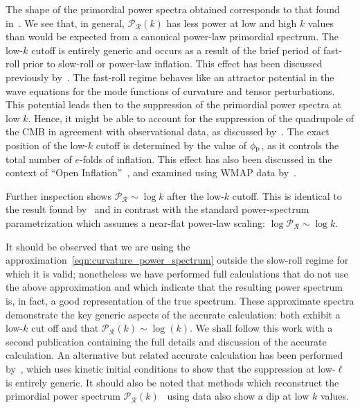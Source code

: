 The shape of the primordial power spectra obtained corresponds to that found in~\cite{lasenby_closed_2003}. We see that, in general, \(\mathcal{P}_\mathcal{R}(k)\) has less power at low and high \(k\) values than would be expected from a canonical power-law primordial spectrum.  The low-\(k\) cutoff is entirely generic and occurs as a result of the brief period of fast-roll prior to slow-roll or power-law inflation.  This effect has been discussed previously by~\cite{boyanovsky_cmb_2006}. The fast-roll regime behaves like an attractor potential in the wave equations for the mode functions of curvature and tensor perturbations. This potential leads then to the suppression of the primordial power spectra at low \(k\).  Hence, it might be able to account for the suppression of the quadrupole of the CMB in agreement with observational data, as discussed by~\cite{boyanovsky_cmb_2006-1}.  The exact position of the low-\(k\) cutoff is determined by the value of \(\phi_{\mathrm{p}}\), as it controls the total number of \(e\)-folds of inflation. This effect has also been discussed in the context of ``Open Inflation''~\citep{Yamauchi_strings_2011,Linde_open_1999,Linde_toy_1999}, and examined using WMAP data by~\cite{Contaldi_suppress_2003}.

Further inspection shows \(\mathcal{P}_\mathcal{R} \sim \log k\) after the low-\(k\) cutoff. This is identical to the result found by~\cite{lasenby_closed_2003} and in contrast with the standard power-spectrum parametrization which assumes a near-flat power-law scaling: \(\log\mathcal{P}_\mathcal{R}\sim \log k\). 

 
It should be observed that we are using the approximation~\eqref{eqn:curvature_power_spectrum} outside the slow-roll regime for which it is valid; nonetheless we have performed full calculations that do not use the above approximation and which indicate that the resulting power spectrum is, in fact, a good representation of the true spectrum. These approximate spectra demonstrate the key generic aspects of the accurate calculation: both exhibit a low-\(k\) cut off and that \(\mathcal{P}_\mathcal{R}(k) \sim \log(k)\).  We shall follow this work with a second publication containing the full details and discussion of the accurate calculation. An alternative but related accurate calculation has been performed by~\cite{Lello_tensor_2013}, which uses kinetic initial conditions to show that the suppression at low-\(\ell\) is entirely generic. It should also be noted that methods which reconstruct the primordial power spectrum \(\mathcal{P}_\mathcal{R}(k)\)~\citep{vazquez_reconstruction,Hazra_reconstruction_2013} using data also show a dip at low \(k\) values.

